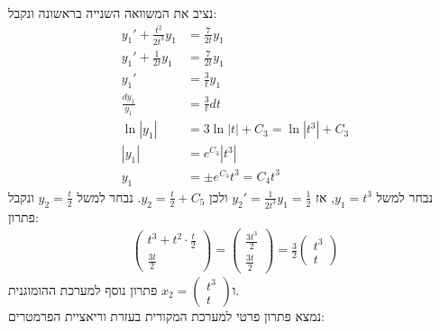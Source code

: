 \documentclass{article}
\begin{document}
נציב את המשוואה השנייה בראשונה ונקבל: \\
\begin{align*}
    y_1'+\frac{t^2}{2t^3}y_1 & =\frac{7}{2t}y_1          \\
    y_1'+\frac{1}{2t}y_1     & =\frac{7}{2t}y_1          \\
    y_1'                     & =\frac{3}{t}y_1           \\
    \frac{dy_1}{y_1}         & =\frac{3}{t}dt            \\
    \ln|y_1|                 & =3\ln|t|+C_3=\ln|t^3|+C_3 \\
    |y_1|                    & =e^{C_3}|t^3|             \\
    y_1                      & = \pm e^{C_3}t^3=C_4t^3
\end{align*}
נבחר למשל $y_1=t^3$, אז $y_2'=\frac{1}{2t^3}y_1=\frac{1}{2}$ ולכן $y_2=\frac{t}{2}+C_5$. נבחר למשל $y_2=\frac{t}{2}$ ונקבל פתרון:
\begin{align*}
    \begin{pmatrix}
        t^3+t^2\cdot \frac{t}{2} \\
        \frac{3t}{2}
    \end{pmatrix}=
    \begin{pmatrix}
        \frac{3t^3}{2} \\
        \frac{3t}{2}
    \end{pmatrix}=\frac{3}{2}\begin{pmatrix}
                                 t^3 \\
                                 t
                             \end{pmatrix}
\end{align*}
ו$x_2=\begin{pmatrix}
        t^3 \\
        t
    \end{pmatrix}$ פתרון נוסף למערכת ההומוגנית.\\
נמצא פתרון פרטי למערכת המקורית בעזרת וריאציית הפרמטרים:
\end{document}
